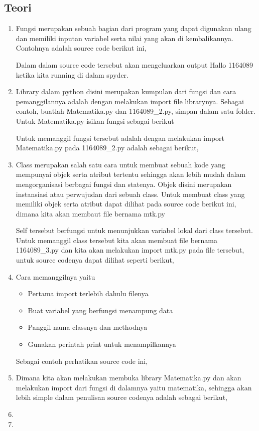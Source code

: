 \subsection{Teori}
\begin{enumerate}
\item Fungsi merupakan sebuah bagian dari program yang dapat digunakan ulang dan memiliki inputan variabel serta nilai yang akan di kembalikannya. Contohnya adalah source code berikut ini,
	 
Dalam dalam source code tersebut akan mengeluarkan output Hallo 1164089 ketika kita running di dalam spyder.

\item Library dalam python disini merupakan kumpulan dari fungsi dan cara pemanggilannya adalah dengan melakukan import file librarynya. Sebagai contoh, buatlah Matematika.py dan 1164089\_2.py, simpan dalam satu folder. Untuk Matematika.py isikan fungsi sebagai berikut
	 
Untuk memanggil fungsi tersebut adalah dengan melakukan import  Matematika.py pada 1164089\_2.py adalah sebagai berikut,
	 

\item Class merupakan salah satu cara untuk membuat sebuah kode yang mempunyai objek serta atribut tertentu sehingga akan lebih mudah dalam mengorganisasi berbagai fungsi dan statenya. Objek disini merupakan instansiasi atau perwujudan dari sebuah class. Untuk membuat class yang memiliki objek serta atribut dapat dilihat pada source code berikut ini, dimana kita akan membaut file bernama mtk.py
	
Self tersebut berfungsi untuk menunjukkan variabel lokal dari class tersebut. Untuk memanggil class tersebut kita akan membuat file bernama 1164089\_3.py dan kita akan melakukan import mtk.py pada file tersebut, untuk source codenya dapat dilihat seperti berikut,
	

\item Cara memanggilnya yaitu
	\begin{itemize}
		\item Pertama import terlebih dahulu filenya
		\item Buat variabel yang berfungsi menampung data
		\item Panggil nama classnya dan methodnya
		\item Gunakan perintah print untuk menampilkannya
	\end{itemize}
Sebagai contoh perhatikan source code ini,
	

\item Dimana kita akan melakukan membuka library Matematika.py dan akan melakukan import dari fungsi di dalamnya yaitu matematika, sehingga akan lebih simple dalam penulisan source codenya adalah sebagai berikut,
	

\item

\item 
\end{enumerate}

